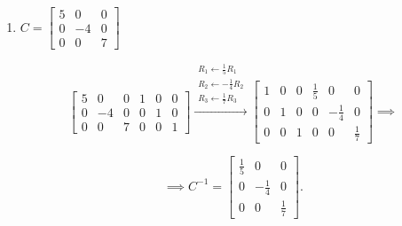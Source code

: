 \begin{enumerate}[label=\alph*)]
\begin{answer}
    $$
    \xrightarrow{R_2\leftarrow-\frac13R_2}
    \left[
    \begin{array}{cc|cc}
        1 & 1 & 1 & 0\\
        0 & 1 & \frac13 & -\frac13
    \end{array}
    \right]
    \xrightarrow{R_1\leftarrow R_1-R_2}
    \left[
    \begin{array}{cc|cc}
        1 & 0 & \frac23 & \frac13\\
        0 & 1 & \frac13 & -\frac13
    \end{array}
    \right] \implies
    $$

    $$
    \implies \boxed{
    B^{-1}=
    \begin{bmatrix}
        \frac23 & \frac13\\
        \frac13 & -\frac13
    \end{bmatrix}
    }.
    $$
\end{answer}


\item
$C=
\begin{bmatrix}
    5 & 0 & 0\\
    0 & -4 & 0\\
    0 & 0 & 7
\end{bmatrix}
$

\begin{answer}
    $$
    \left[
    \begin{array}{ccc|ccc}
        5 & 0 & 0 & 1 & 0 & 0\\
        0 & -4 & 0 & 0 & 1 & 0\\
        0 & 0 & 7 & 0 & 0 & 1
    \end{array}
    \right]
    \xrightarrow{
        \substack{
            R_1\leftarrow\frac15R_1\\
            R_2\leftarrow-\frac14R_2\\
            R_3\leftarrow\frac17R_3
        }
    }
    \left[
    \begin{array}{ccc|ccc}
        1 & 0 & 0 & \frac15 & 0 & 0\\
        0 & 1 & 0 & 0 & -\frac14 & 0\\
        0 & 0 & 1 & 0 & 0 & \frac17
    \end{array}
    \right] \implies
    $$

    $$
    \implies \boxed{
    C^{-1}=
    \begin{bmatrix}
        \frac15 & 0 & 0\\
        0 & -\frac14 & 0\\
        0 & 0 & \frac17
    \end{bmatrix}
    }.
    $$
\end{answer}



\end{enumerate}
